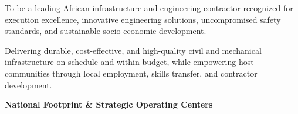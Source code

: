 \noindent
\begin{minipage}[t]{0.485\textwidth}
    \begin{tcolorbox}[
        enhanced, colback=white, colframe=mhlightgray, boxrule=0.8pt, arc=4pt,
        title={\bfseries\color{white}\faEye\ Our Vision},
        colbacktitle=mhnavy, fonttitle=\bfseries\small,
        left=8pt, right=8pt, top=8pt, bottom=8pt,
        drop shadow=black!4
    ]
        {\fontsize{8.6pt}{12.2pt}\selectfont\color{mhtext}
        To be a leading African infrastructure and engineering contractor recognized for execution excellence, innovative engineering solutions, uncompromised safety standards, and sustainable socio-economic development.
        }
    \end{tcolorbox}
\end{minipage}
\hfill
\begin{minipage}[t]{0.485\textwidth}
    \begin{tcolorbox}[
        enhanced, colback=white, colframe=mhlightgray, boxrule=0.8pt, arc=4pt,
        title={\bfseries\color{white}\faBullseye\ Our Mission},
        colbacktitle=mhblue, fonttitle=\bfseries\small,
        left=8pt, right=8pt, top=8pt, bottom=8pt,
        drop shadow=black!4
    ]
        {\fontsize{8.6pt}{12.2pt}\selectfont\color{mhtext}
        Delivering durable, cost-effective, and high-quality civil and mechanical infrastructure on schedule and within budget, while empowering host communities through local employment, skills transfer, and contractor development.
        }
    \end{tcolorbox}
\end{minipage}

\vfill

{\large\bfseries\color{mhnavy} National Footprint \& Strategic Operating Centers}
\vspace{0.10cm}

